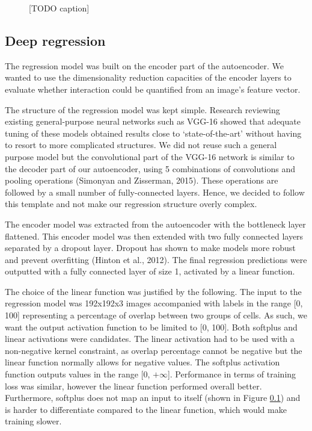 \begin{figure}[h]
    \centering
    \caption{[TODO caption]}
    \label{fig:autoencoder_details}
\end{figure}

\subsection{Deep regression}

The regression model was built on the encoder part of the autoencoder. We wanted to use the dimensionality reduction capacities of the encoder layers to evaluate whether interaction could be quantified from an image's feature vector.

The structure of the regression model was kept simple. Research reviewing existing general-purpose neural networks such as VGG-16 showed that adequate tuning of these models obtained results close to `state-of-the-art' without having to resort to more complicated structures. We did not reuse such a general purpose model but the convolutional part of the VGG-16 network is similar to the decoder part of our autoencoder, using 5 combinations of convolutions and pooling operations (Simonyan and Zisserman, 2015). These operations are followed by a small number of fully-connected layers. Hence, we decided to follow this template and not make our regression structure overly complex.

The encoder model was extracted from the autoencoder with the bottleneck layer flattened. This encoder model was then extended with two fully connected layers separated by a dropout layer. Dropout has shown to make models more robust and prevent overfitting (Hinton et al., 2012). The final regression predictions were outputted with a fully connected layer of size 1, activated by a linear function.

The choice of the linear function was justified by the following. The input to the regression model was 192x192x3 images accompanied with labels in the range [0, 100] representing a percentage of overlap between two groups of cells. As such, we want the output activation function to be limited to [0, 100]. Both softplus and linear activations were candidates. The linear activation had to be used with a non-negative kernel constraint, as overlap percentage cannot be negative but the linear function normally allows for negative values. The softplus activation function outputs values in the range [0, $+\infty$]. Performance in terms of training loss was similar, however the linear function performed overall better. Furthermore, softplus does not map an input to itself (shown in Figure \ref{}) and is harder to differentiate compared to the linear function, which would make training slower.

